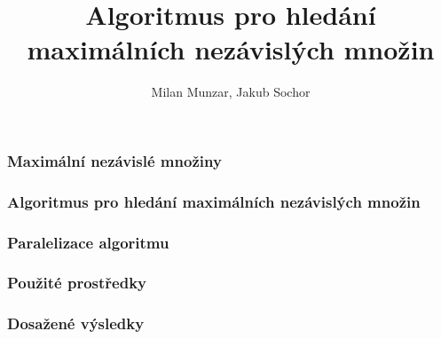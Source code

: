 \documentclass[table, czech]{beamer}
\title{Algoritmus pro hledání maximálních nezávislých množin}
\author{Milan Munzar, Jakub Sochor}
\institute[FIT]{Fakulta informačních technologií VUT v Brně}
\begin{document}
\frame[plain] { \titlepage }


\frame
{
    \frametitle{Maximální nezávislé množiny}
}

\frame
{
    \frametitle{Algoritmus pro hledání maximálních nezávislých množin}
}

\frame
{
    \frametitle{Paralelizace algoritmu}
}

\frame
{
    \frametitle{Použité prostředky}
}


\frame
{
    \frametitle{Dosažené výsledky}
}
\end{document}
